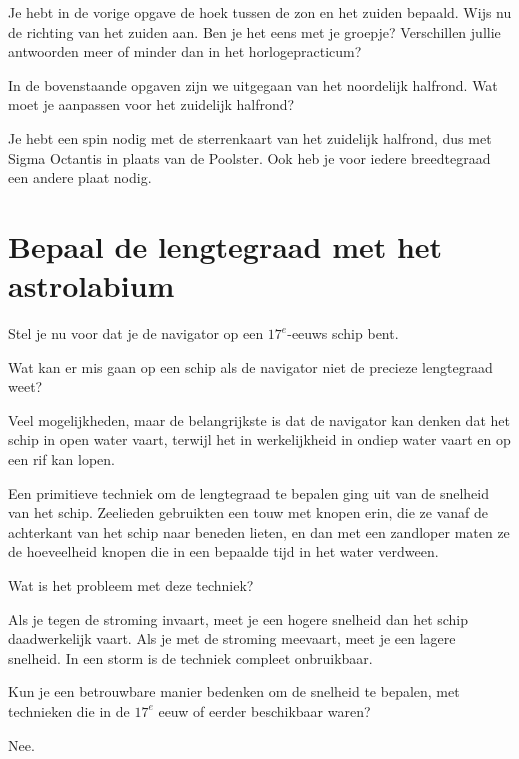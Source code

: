 \begin{opgave}[\discussie]
 Je hebt in de vorige opgave de hoek tussen de zon en het zuiden bepaald. Wijs nu de richting van het zuiden aan. Ben je het eens met je groepje? Verschillen jullie antwoorden meer of minder dan in het horlogepracticum?
\end{opgave}

\begin{opgave}
 In de bovenstaande opgaven zijn we uitgegaan van het noordelijk halfrond. Wat moet je aanpassen voor het zuidelijk halfrond?
 \begin{antwoord}
  Je hebt een spin nodig met de sterrenkaart van het zuidelijk halfrond, dus met Sigma Octantis in plaats van de Poolster. Ook heb je voor iedere breedtegraad een andere plaat nodig.
 \end{antwoord}

\end{opgave}

\section{Bepaal de lengtegraad met het astrolabium}
Stel je nu voor dat je de navigator op een $17^e$-eeuws schip bent. 
\begin{opgave}
 Wat kan er mis gaan op een schip als de navigator niet de precieze lengtegraad weet?
 \begin{antwoord}
  Veel mogelijkheden, maar de belangrijkste is dat de navigator kan denken dat het schip in open water vaart, terwijl het in werkelijkheid in ondiep water vaart en op een rif kan lopen.
 \end{antwoord}
\end{opgave}

\begin{opgave}
 Een primitieve techniek om de lengtegraad te bepalen ging uit van de snelheid van het schip. Zeelieden gebruikten een touw met knopen erin, die ze vanaf de achterkant van het schip naar beneden lieten, en dan met een zandloper maten ze de hoeveelheid knopen die in een bepaalde tijd in het water verdween.
 \begin{subopgave}
  Wat is het probleem met deze techniek?
  \begin{antwoord}
   Als je tegen de stroming invaart, meet je een hogere snelheid dan het schip daadwerkelijk vaart. Als je met de stroming meevaart, meet je een lagere snelheid. In een storm is de techniek compleet onbruikbaar.
  \end{antwoord}
 \end{subopgave}
 \begin{subopgave}
 Kun je een betrouwbare manier bedenken om de snelheid te bepalen, met technieken die in de $17^e$ eeuw of eerder beschikbaar waren?
 \begin{antwoord}
  Nee.
 \end{antwoord}
 \end{subopgave}
\end{opgave}

